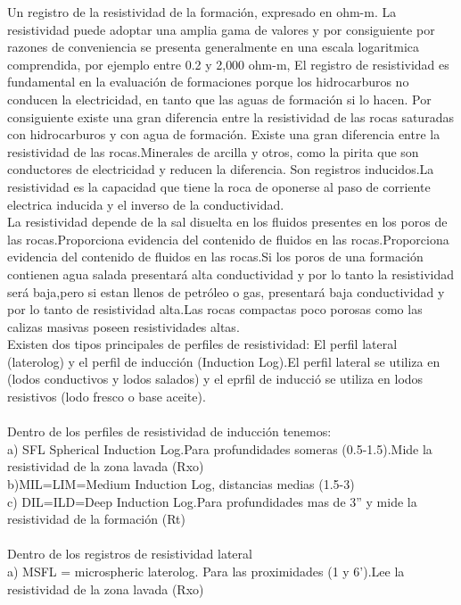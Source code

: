 \documentclass[10pt,a4paper]{report}
\begin{document}
\newpage
Un registro de la resistividad de la formación, expresado en ohm-m. La resistividad puede adoptar una amplia gama de valores y por consiguiente por razones de conveniencia se presenta generalmente en una escala logaritmica comprendida, por ejemplo entre 0.2 y 2,000 ohm-m, El registro de resistividad es fundamental en la evaluación de formaciones porque los hidrocarburos no conducen la electricidad, en tanto que las aguas de formación si lo hacen. Por consiguiente existe una gran diferencia entre la resistividad de las rocas saturadas con hidrocarburos y con agua de formación. Existe una gran diferencia entre la resistividad de las rocas.Minerales de arcilla y otros, como la pirita que son conductores de electricidad y reducen la diferencia. Son registros inducidos.La resistividad es la capacidad que tiene la roca de oponerse al paso de corriente electrica inducida y el inverso de la conductividad.
\\ La resistividad depende de la sal disuelta en los fluidos presentes en los poros de las rocas.Proporciona evidencia del contenido de fluidos en las rocas.Proporciona evidencia del contenido de fluidos en las rocas.Si los poros de una formación contienen agua salada presentará alta conductividad y por lo tanto la resistividad será baja,pero si estan llenos de petróleo o gas, presentará baja conductividad y por lo tanto de resistividad alta.Las rocas compactas poco porosas como las calizas masivas poseen resistividades altas.
\\ Existen dos tipos principales de perfiles de resistividad: El perfil lateral (laterolog) y el perfil de inducción (Induction Log).El perfil lateral se utiliza en (lodos conductivos y lodos salados) y el eprfil de inducció se utiliza en lodos resistivos (lodo fresco o base aceite).
\\\\Dentro de los perfiles de resistividad de inducción tenemos:
\\a) SFL Spherical Induction Log.Para profundidades someras (0.5-1.5).Mide la resistividad de la zona lavada (Rxo)
\\ b)MIL=LIM=Medium Induction Log, distancias medias (1.5-3)
\\ c) DIL=ILD=Deep Induction Log.Para profundidades mas de 3'' y mide la resistividad de la formación (Rt)
\\\\ Dentro de los registros de resistividad lateral
\\ a) MSFL = microspheric laterolog. Para las proximidades (1 y 6').Lee la resistividad de la zona lavada (Rxo)
\end{document}
